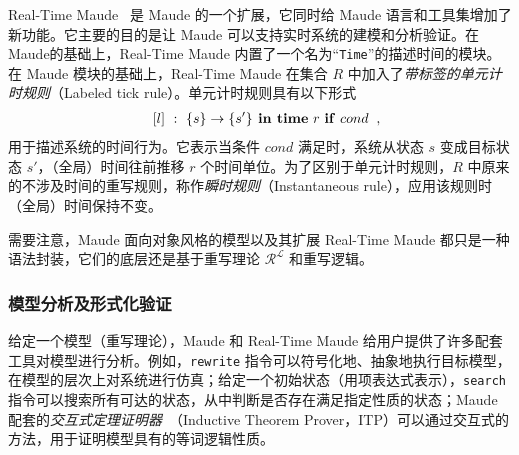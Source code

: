 Real-Time Maude~\cite{DBLP:journals/lisp/OlveczkyM07} 是 Maude 的一个扩展，它同时给 Maude 语言和工具集增加了新功能。它主要的目的是让 Maude 可以支持实时系统的建模和分析验证。在Maude的基础上，Real-Time Maude 内置了一个名为“\verb|Time|”的描述时间的模块。在 Maude 模块的基础上，Real-Time Maude 在集合 $\mathit{R}$ 中加入了\emph{带标签的单元计时规则}（Labeled tick rule）。单元计时规则具有以下形式
\begin{eqnarray}
& & [l]~:~\{s\}\rightarrow\{s'\} \mbox{\textbf{ in time}
  }r\mbox{ \textbf{if} }cond \;\; , \nonumber
\end{eqnarray} 
用于描述系统的时间行为。它表示当条件 $cond$ 满足时，系统从状态 $s$ 变成目标状态 $s'$，（全局）时间往前推移 $r$ 个时间单位。为了区别于单元计时规则，$\mathit{R}$ 中原来的不涉及时间的重写规则，称作\emph{瞬时规则}（Instantaneous rule），应用该规则时（全局）时间保持不变。

需要注意，Maude 面向对象风格的模型以及其扩展 Real-Time Maude 都只是一种语法封装，它们的底层还是基于重写理论 $\mathcal{R^L}$ 和重写逻辑。 

\subsubsection{模型分析及形式化验证}
给定一个模型（重写理论），Maude 和 Real-Time Maude 给用户提供了许多配套工具对模型进行分析。例如，\verb|rewrite| 指令可以符号化地、抽象地执行目标模型，在模型的层次上对系统进行仿真；给定一个初始状态（用项表达式表示），\verb|search| 指令可以搜索所有可达的状态，从中判断是否存在满足指定性质的状态；Maude 配套的\emph{交互式定理证明器}~\cite{DBLP:journals/jucs/ClavelPR06}（Inductive Theorem Prover，ITP）可以通过交互式的方法，用于证明模型具有的等词逻辑性质。


